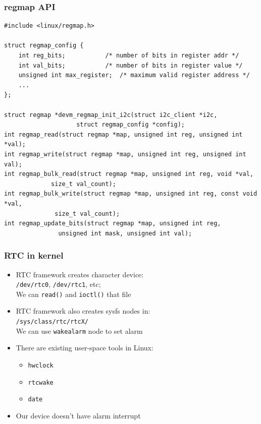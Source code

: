 \begin{frame}[containsverbatim]
  \frametitle{regmap API}
  \begin{lstlisting}[style=c]
#include <linux/regmap.h>

struct regmap_config {
	int reg_bits;			/* number of bits in register addr */
	int val_bits;			/* number of bits in register value */
	unsigned int max_register;	/* maximum valid register address */
	...
};

struct regmap *devm_regmap_init_i2c(struct i2c_client *i2c,
				    struct regmap_config *config);
int regmap_read(struct regmap *map, unsigned int reg, unsigned int *val);
int regmap_write(struct regmap *map, unsigned int reg, unsigned int val);
int regmap_bulk_read(struct regmap *map, unsigned int reg, void *val,
		     size_t val_count);
int regmap_bulk_write(struct regmap *map, unsigned int reg, const void *val,
		      size_t val_count);
int regmap_update_bits(struct regmap *map, unsigned int reg,
		       unsigned int mask, unsigned int val);
  \end{lstlisting}
\end{frame}

\begin{frame}
  \frametitle{RTC in kernel}
  \begin{itemize}
    \item RTC framework creates character device: \\
          \texttt{/dev/rtc0}, \texttt{/dev/rtc1}, etc; \\
          We can \texttt{read()} and \texttt{ioctl()} that file
    \item RTC framework also creates sysfs nodes in: \\
          \texttt{/sys/class/rtc/rtcX/} \\
          We can use \texttt{wakealarm} node to set alarm
    \item There are existing user-space tools in Linux:
      \begin{itemize}
        \item \texttt{hwclock}
        \item \texttt{rtcwake}
        \item \texttt{date}
      \end{itemize}
    \item Our device doesn't have alarm interrupt
  \end{itemize}
\end{frame}

